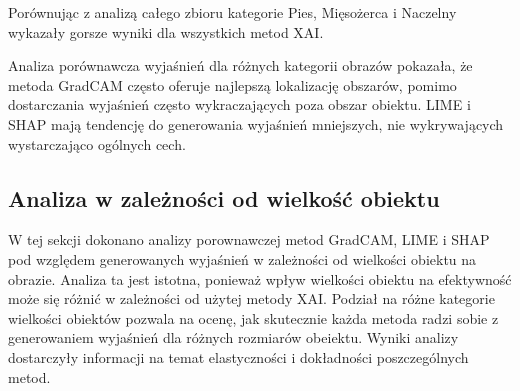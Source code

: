 Porównując z analizą całego zbioru kategorie Pies, Mięsożerca i Naczelny wykazały gorsze wyniki dla wszystkich metod XAI.

\vspace{1cm}

Analiza porównawcza wyjaśnień dla różnych kategorii obrazów pokazała, że metoda GradCAM często oferuje najlepszą lokalizację obszarów, pomimo dostarczania wyjaśnień często wykraczających poza obszar obiektu.
LIME i SHAP mają tendencję do generowania wyjaśnień mniejszych, nie wykrywających wystarczająco ogólnych cech.

\subsection*{Analiza w zależności od wielkość obiektu}

W tej sekcji dokonano analizy porownawczej metod GradCAM, LIME i SHAP pod względem generowanych wyjaśnień w zależności od wielkości obiektu na obrazie.
Analiza ta jest istotna, ponieważ wpływ wielkości obiektu na efektywność może się różnić w zależności od użytej metody XAI.
Podział na różne kategorie wielkości obiektów pozwala na ocenę, jak skutecznie każda metoda radzi sobie z generowaniem wyjaśnień dla różnych rozmiarów obeiektu.
Wyniki analizy dostarczyły informacji na temat elastyczności i dokładności poszczególnych metod.


